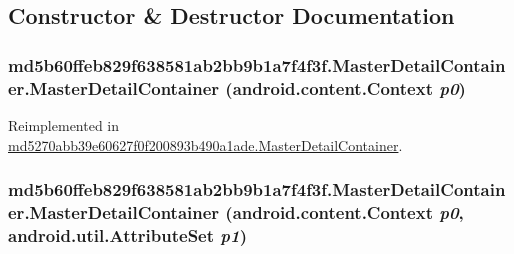 \subsection{Constructor \& Destructor Documentation}
\hypertarget{classmd5b60ffeb829f638581ab2bb9b1a7f4f3f_1_1_master_detail_container_1af6b6d44bea0fd2817369e2e442b274}{
\subsubsection[{MasterDetailContainer}]{\setlength{\rightskip}{0pt plus 5cm}md5b60ffeb829f638581ab2bb9b1a7f4f3f.MasterDetailContainer.MasterDetailContainer (android.content.Context {\em p0})}}
\label{classmd5b60ffeb829f638581ab2bb9b1a7f4f3f_1_1_master_detail_container_1af6b6d44bea0fd2817369e2e442b274}




Reimplemented in \hyperlink{classmd5270abb39e60627f0f200893b490a1ade_1_1_master_detail_container_9807f2073f88d818e7daa1d67838ea41}{md5270abb39e60627f0f200893b490a1ade.MasterDetailContainer}.\hypertarget{classmd5b60ffeb829f638581ab2bb9b1a7f4f3f_1_1_master_detail_container_c9b0445081c2aabb67adc98d6b8c9ca1}{
\subsubsection[{MasterDetailContainer}]{\setlength{\rightskip}{0pt plus 5cm}md5b60ffeb829f638581ab2bb9b1a7f4f3f.MasterDetailContainer.MasterDetailContainer (android.content.Context {\em p0}, \/  android.util.AttributeSet {\em p1})}}
\label{classmd5b60ffeb829f638581ab2bb9b1a7f4f3f_1_1_master_detail_container_c9b0445081c2aabb67adc98d6b8c9ca1}




